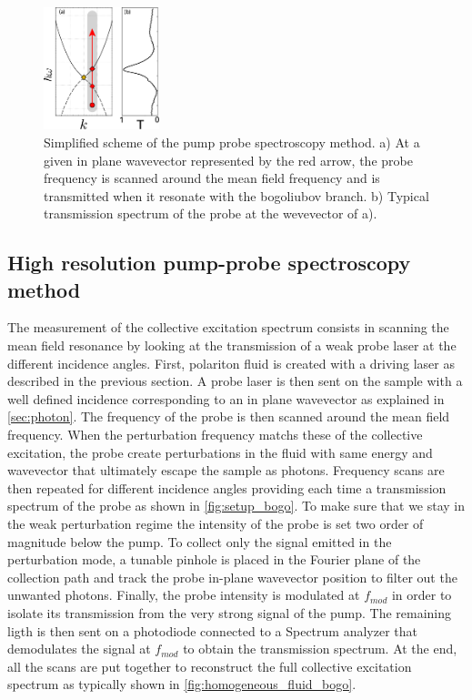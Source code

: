 \begin{figure}[h]
    \centering
    \includegraphics[width=0.3\textwidth]{chap_custom_st/fig/setup_bogoliubov.pdf}
    \caption{Simplified scheme of the pump probe spectroscopy method. a) At a given in plane wavevector represented by the red arrow, the probe frequency is scanned around the mean field frequency and is transmitted when it resonate with the bogoliubov branch. b) Typical transmission spectrum of the probe at the wevevector of a).}
    \label{fig:setup_bogo}
\end{figure}


\subsection{High resolution pump-probe spectroscopy method}

\label{sub:high_resolution_spectroscopy}

The measurement of the collective excitation spectrum consists in scanning the mean field resonance by looking at the transmission of a weak probe laser at the different incidence angles. First, polariton fluid is created with a driving laser as described in the previous section. A probe laser is then sent on the sample with a well defined incidence corresponding to an in plane wavevector as explained in \autoref{sec:photon}. The frequency of 
the probe is then scanned around the mean field frequency. When the perturbation frequency matchs these of the collective excitation, the probe create perturbations in the fluid with same energy and wavevector that ultimately escape the sample as photons. Frequency scans are then repeated for different incidence angles providing each time a transmission spectrum of the probe as shown in \autoref{fig:setup_bogo}. 
To make sure that we stay in the weak perturbation regime the intensity of the probe is set two order of magnitude below the pump. To collect only the signal emitted in the perturbation mode, a tunable pinhole is placed in the Fourier plane of the collection path and track the probe in-plane wavevector position to filter out the unwanted photons. Finally, the probe intensity is modulated at $f_{mod}$ in order to isolate its transmission from the very strong signal of the pump. The remaining ligth is then sent on
a photodiode connected to a Spectrum analyzer that demodulates the signal at $f_{mod}$ to obtain the transmission spectrum. At the end, all the scans are put together to reconstruct the full collective excitation spectrum as typically shown in \autoref{fig:homogeneous_fluid_bogo}.




